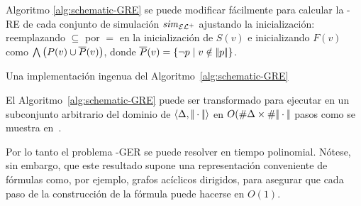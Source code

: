 Algoritmo \ref{alg:schematic-GRE} se puede modificar f\'acilmente para
calcular la \ELAN-RE de cada conjunto de simulaci\'on ${\it sim}_{{\mathcal{EL}^+}}$ 
ajustando la inicializaci\'on: reemplazando $\subseteq$ por $=$ en la
inicializaci\'on de $S(v)$ e inicializando $F(v)$ como
$\bigwedge\left(P(v)\cup\overline {P}(v)\right)$,
donde $\overline {P}(v)=\{\lnot p\mid v\notin|\!|p|\!|\}$.


Una implementaci\'on ingenua del Algoritmo~\ref{alg:schematic-GRE}

El Algoritmo~\ref{alg:schematic-GRE} puede ser transformado para ejecutar en un subconjunto arbitrario del dominio de $\langle \Delta,|\!|\cdot|\!| \rangle$
 en $O(\# \Delta\times\# |\!|\cdot|\!|$ pasos como se muestra en~\cite{HHK95}. 


%

%



Por lo tanto el problema \EL-GER se puede resolver en tiempo polinomial. N\'otese, sin embargo, que este resultado supone una representaci\'on conveniente de
f\'ormulas como, por ejemplo, grafos ac\'iclicos dirigidos, para asegurar que
cada paso de la construcci\'on de la f\'ormula puede hacerse en $O(1)$. %


